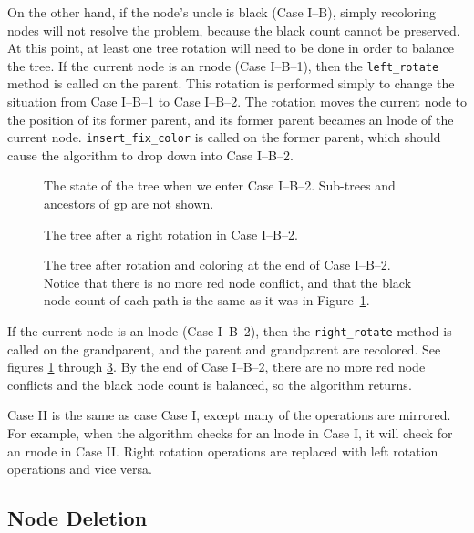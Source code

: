 \documentclass[12pt, letterpaper]{article}
\begin{document}
On the other hand, if the node's uncle is black (Case I--B), simply recoloring nodes will not resolve the problem, because the black count cannot be preserved. At this point, at least one tree rotation will need to be done in order to balance the tree.
\pagebreak
If the current node is an rnode (Case I--B--1), then the \texttt{left\_rotate} method is called on the parent. This rotation is performed simply to change the situation from Case I--B--1 to Case I--B--2. The rotation moves the current node to the position of its former parent, and its former parent becames an lnode of the current node. \texttt{insert\_fix\_color} is called on the former parent, which should cause the algorithm to drop down into Case I--B--2.
\begin{figure}
\centering
{}
\label{Case1b2Before}
\caption{The state of the tree when we enter Case I--B--2. Sub-trees and ancestors of gp are not shown.}
\end{figure}
\begin{figure}
\centering
{}
\label{Case1b2Rotated}
\caption{The tree after a right rotation in Case I--B--2.}
\end{figure}
\begin{figure}
\centering
{}
\label{Case1b2Colored}
\caption{The tree after rotation and coloring at the end of Case I--B--2. Notice that there is no more red node conflict, and that the black node count of each path is the same as it was in Figure~\ref{Case1b2Before}.}
\end{figure}

If the current node is an lnode (Case I--B--2), then the \texttt{right\_rotate} method is called on the grandparent, and the parent and grandparent are recolored. See figures \ref{Case1b2Before} through \ref{Case1b2Colored}. By the end of Case I--B--2, there are no more red node conflicts and the black node count is balanced, so the algorithm returns.

Case II is the same as case Case I, except many of the operations are mirrored. For example, when the algorithm checks for an lnode in Case I, it will check for an rnode in Case II. Right rotation operations are replaced with left rotation operations and vice versa.

\subsection{Node Deletion}
\end{document}
